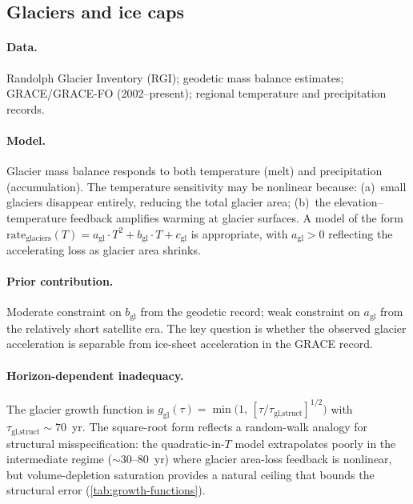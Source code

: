 \documentclass[11pt]{article}
\begin{document}
\subsection{Glaciers and ice caps}
\label{sec:glaciers}

\paragraph{Data.}  Randolph Glacier Inventory (RGI); geodetic mass balance estimates; GRACE/GRACE-FO (2002--present); regional temperature and precipitation records.

\paragraph{Model.}  Glacier mass balance responds to both temperature (melt) and precipitation (accumulation).  The temperature sensitivity may be nonlinear because: (a)~small glaciers disappear entirely, reducing the total glacier area; (b)~the elevation--temperature feedback amplifies warming at glacier surfaces.  A model of the form $\text{rate}_{\text{glaciers}}(T) = a_{\text{gl}} \cdot T^2 + b_{\text{gl}} \cdot T + c_{\text{gl}}$ is appropriate, with $a_{\text{gl}} > 0$ reflecting the accelerating loss as glacier area shrinks.

\paragraph{Prior contribution.}  Moderate constraint on $b_{\text{gl}}$ from the geodetic record; weak constraint on $a_{\text{gl}}$ from the relatively short satellite era.  The key question is whether the observed glacier acceleration is separable from ice-sheet acceleration in the GRACE record.

\paragraph{Horizon-dependent inadequacy.}  The glacier growth function is $g_{\text{gl}}(\tau) = \min\!\bigl(1,\, [\tau / \tau_{\text{gl,struct}}]^{1/2}\bigr)$ with $\tau_{\text{gl,struct}} \sim 70$~yr.  The square-root form reflects a random-walk analogy for structural misspecification: the quadratic-in-$T$ model extrapolates poorly in the intermediate regime ($\sim$30--80~yr) where glacier area-loss feedback is nonlinear, but volume-depletion saturation provides a natural ceiling that bounds the structural error (\cref{tab:growth-functions}).
\end{document}
